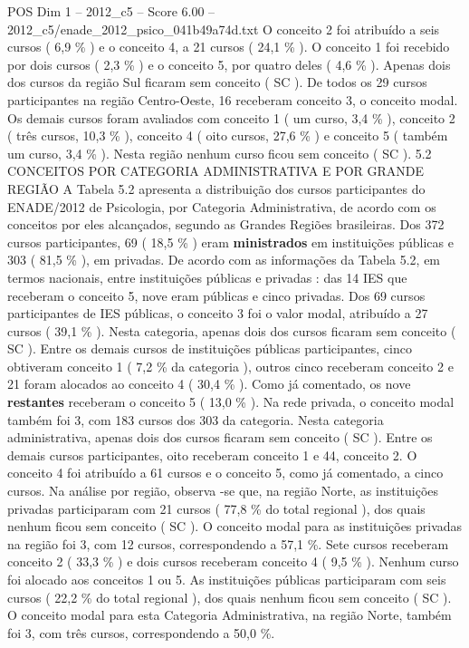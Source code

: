 \begin{textsample}{POS Dim 1 – 2012\_c5 – Score 6.00 – 2012\_c5/enade\_2012\_psico\_041b49a74d.txt}
O conceito 2 foi atribuído a seis cursos ( 6,9 \% ) e o conceito 4, a 21 cursos ( 24,1 \% ).
O conceito 1 foi recebido por dois cursos ( 2,3 \% ) e o conceito 5, por quatro deles ( 4,6 \% ).
Apenas dois dos cursos da região Sul ficaram sem conceito ( SC ).
De todos os 29 cursos participantes na região Centro-Oeste, 16 receberam conceito 3, o conceito modal.
Os demais cursos foram avaliados com conceito 1 ( um curso, 3,4 \% ), conceito 2 ( três cursos, 10,3 \% ), conceito 4 ( oito cursos, 27,6 \% ) e conceito 5 ( também um curso, 3,4 \% ).
Nesta região nenhum curso ficou sem conceito ( SC ). 5.2 CONCEITOS POR CATEGORIA ADMINISTRATIVA E POR GRANDE REGIÃO A Tabela 5.2 apresenta a distribuição dos cursos participantes do ENADE/2012 de Psicologia, por Categoria Administrativa, de acordo com os conceitos por eles alcançados, segundo as Grandes Regiões brasileiras.
Dos 372 cursos participantes, 69 ( 18,5 \% ) eram \textbf{ministrados} em instituições públicas e 303 ( 81,5 \% ), em privadas.
De acordo com as informações da Tabela 5.2, em termos nacionais, entre instituições públicas e privadas : das 14 IES que receberam o conceito 5, nove eram públicas e cinco privadas.
Dos 69 cursos participantes de IES públicas, o conceito 3 foi o valor modal, atribuído a 27 cursos ( 39,1 \% ).
Nesta categoria, apenas dois dos cursos ficaram sem conceito ( SC ).
Entre os demais cursos de instituições públicas participantes, cinco obtiveram conceito 1 ( 7,2 \% da categoria ), outros cinco receberam conceito 2 e 21 foram alocados ao conceito 4 ( 30,4 \% ).
Como já comentado, os nove \textbf{restantes} receberam o conceito 5 ( 13,0 \% ).
Na rede privada, o conceito modal também foi 3, com 183 cursos dos 303 da categoria.
Nesta categoria administrativa, apenas dois dos cursos ficaram sem conceito ( SC ).
Entre os demais cursos participantes, oito receberam conceito 1 e 44, conceito 2.
O conceito 4 foi atribuído a 61 cursos e o conceito 5, como já comentado, a cinco cursos.
Na análise por região, observa -se que, na região Norte, as instituições privadas participaram com 21 cursos ( 77,8 \% do total regional ), dos quais nenhum ficou sem conceito ( SC ).
O conceito modal para as instituições privadas na região foi 3, com 12 cursos, correspondendo a 57,1 \%.
Sete cursos receberam conceito 2 ( 33,3 \% ) e dois cursos receberam conceito 4 ( 9,5 \% ).
Nenhum curso foi alocado aos conceitos 1 ou 5.
As instituições públicas participaram com seis cursos ( 22,2 \% do total regional ), dos quais nenhum ficou sem conceito ( SC ).
O conceito modal para esta Categoria Administrativa, na região Norte, também foi 3, com três cursos, correspondendo a 50,0 \%.

\end{textsample}
